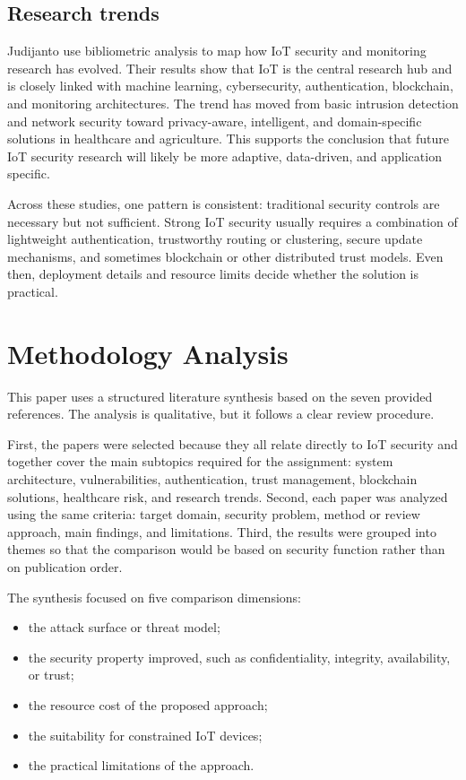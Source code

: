 \documentclass[conference]{IEEEtran}
\begin{document}
\subsection{Research trends}
Judijanto \cite{bibliometric} use bibliometric analysis to map how IoT security and monitoring research has evolved. Their results show that IoT is the central research hub and is closely linked with machine learning, cybersecurity, authentication, blockchain, and monitoring architectures. The trend has moved from basic intrusion detection and network security toward privacy-aware, intelligent, and domain-specific solutions in healthcare and agriculture. This supports the conclusion that future IoT security research will likely be more adaptive, data-driven, and application specific.

Across these studies, one pattern is consistent: traditional security controls are necessary but not sufficient. Strong IoT security usually requires a combination of lightweight authentication, trustworthy routing or clustering, secure update mechanisms, and sometimes blockchain or other distributed trust models. Even then, deployment details and resource limits decide whether the solution is practical.

\section{Methodology Analysis}
This paper uses a structured literature synthesis based on the seven provided references. The analysis is qualitative, but it follows a clear review procedure.

First, the papers were selected because they all relate directly to IoT security and together cover the main subtopics required for the assignment: system architecture, vulnerabilities, authentication, trust management, blockchain solutions, healthcare risk, and research trends. Second, each paper was analyzed using the same criteria: target domain, security problem, method or review approach, main findings, and limitations. Third, the results were grouped into themes so that the comparison would be based on security function rather than on publication order.

The synthesis focused on five comparison dimensions:
\begin{itemize}
\item the attack surface or threat model;
\item the security property improved, such as confidentiality, integrity, availability, or trust;
\item the resource cost of the proposed approach;
\item the suitability for constrained IoT devices;
\item the practical limitations of the approach.
\end{itemize}
\end{document}
